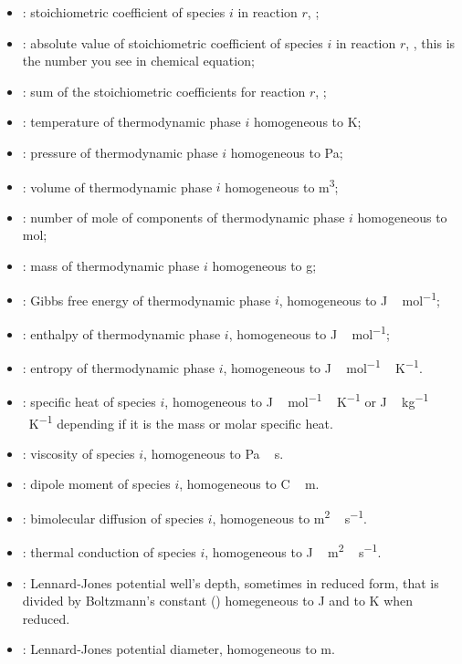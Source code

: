 \begin{itemize}
\item \scoef[i,r]:        stoichiometric coefficient of species $i$ in reaction $r$, \nounit;
\item \scoefabs[i,r]:     absolute value of stoichiometric coefficient of species $i$ in reaction $r$, \nounit, this is the number
                            you see in chemical equation;
\item \sumscoef[r]:       sum of the stoichiometric coefficients for reaction $r$, \nounit;
\item \Temp[i]:           temperature of thermodynamic  phase $i$ homogeneous to \unit{K}; 
\item \Press[i]:          pressure of thermodynamic  phase $i$ homogeneous to \unit{Pa}; 
\item \Vol[i]:            volume of thermodynamic  phase $i$ homogeneous to \unit{m^3}; 
\item \Mol[i]:            number of mole of components of thermodynamic  phase $i$ homogeneous to \unit{mol}; 
\item \Mass[i]:           mass of thermodynamic  phase $i$ homogeneous to \unit{g}; 
\item \Gibbs[i]:          Gibbs free energy of thermodynamic phase $i$, homogeneous to \unit{J\,mol^{-1}};
\item \Enth[i]:           enthalpy of thermodynamic phase $i$, homogeneous to \unit{J\,mol^{-1}};
\item \Entr[i]:           entropy of thermodynamic phase $i$, homogeneous to \unit{J\,mol^{-1}\,K^{-1}}.
\item \specificHeat[i]:   specific heat of species $i$, homogeneous to \unit{J\,mol^{-1}\,K^{-1}} or
                                \unit{J\,kg^{-1}\,K^{-1}} depending if it is the mass or molar
                                specific heat.
\item \vis[i]:            viscosity of species $i$, homogeneous to \unit{Pa\,s}.
\item \dipole[i]:         dipole moment of species $i$, homogeneous to \unit{C\,m}.
\item \diff[i]:           bimolecular diffusion of species $i$, homogeneous to \unit{m^2\,s^{-1}}.
\item \thermcond[i]:      thermal conduction of species $i$, homogeneous to \unit{J\,m^2\,s^{-1}}.
\item \LJdepth[i]:        Lennard-Jones potential well's depth, sometimes in reduced form, that
                          is divided by Boltzmann's constant (\BoltzmannEquation)
                          homegeneous to \unit{J} and to \unit{K} when reduced.
\item \LJdia[i]:          Lennard-Jones potential diameter, homogeneous to \unit{m}.
\end{itemize}
